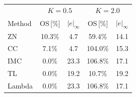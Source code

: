\begin{tabular}{@{}lcccc@{}}
\toprule
 & \multicolumn{2}{c}{$K=0.5$} & \multicolumn{2}{c}{$K=2.0$} \\
Method & OS\,[\%] & $|e|_\infty$ & OS\,[\%] & $|e|_\infty$ \\
\midrule
ZN & 10.3\% & 4.7 & 59.4\% & 14.1 \\
CC & 7.1\% & 4.7 & 104.0\% & 15.3 \\
IMC & 0.0\% & 23.3 & 106.8\% & 17.1 \\
TL & 0.0\% & 19.2 & 10.7\% & 19.2 \\
Lambda & 0.0\% & 23.3 & 106.8\% & 17.1 \\
\bottomrule
\end{tabular}
